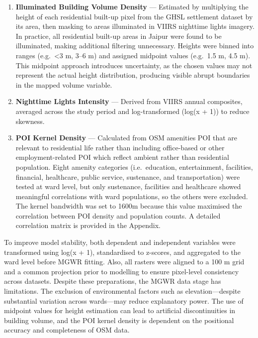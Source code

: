 \documentclass[
  12pt,
  oneside]{book}
\begin{document}
\begin{enumerate}
\def\labelenumi{\arabic{enumi}.}
\item
  \textbf{Illuminated Building Volume Density} --- Estimated by multiplying the height of each residential built-up pixel from the GHSL settlement dataset by its area, then masking to areas illuminated in VIIRS nighttime lights imagery. In practice, all residential built-up areas in Jaipur were found to be illuminated, making additional filtering unnecessary. Heights were binned into ranges (e.g.~\textless3 m, 3--6 m) and assigned midpoint values (e.g.~1.5 m, 4.5 m). This midpoint approach introduces uncertainty, as the chosen values may not represent the actual height distribution, producing visible abrupt boundaries in the mapped volume variable.
\item
  \textbf{Nighttime Lights Intensity} --- Derived from VIIRS annual composites, averaged across the study period and log-transformed (log(x + 1)) to reduce skewness.
\item
  \textbf{POI Kernel Density} --- Calculated from OSM amenities POI that are relevant to residential life rather than including office-based or other employment-related POI which reflect ambient rather than residential population. Eight amenity categories (i.e.~education, entertainment, facilities, financial, healthcare, public service, sustenance, and transportation) were tested at ward level, but only sustenance, facilities and healthcare showed meaningful correlations with ward populations, so the others were excluded. The kernel bandwidth was set to 1600m because this value maximised the correlation between POI density and population counts. A detailed correlation matrix is provided in the Appendix.
\end{enumerate}

To improve model stability, both dependent and independent variables were transformed using log(x + 1), standardised to z-scores, and aggregated to the ward level before MGWR fitting. Also, all rasters were aligned to a 100 m grid and a common projection prior to modelling to ensure pixel-level consistency across datasets. Despite these preparations, the MGWR data stage has limitations. The exclusion of environmental factors such as elevation---despite substantial variation across wards---may reduce explanatory power. The use of midpoint values for height estimation can lead to artificial discontinuities in building volume, and the POI kernel density is dependent on the positional accuracy and completeness of OSM data.
\end{document}
